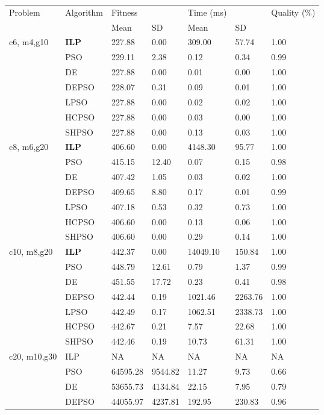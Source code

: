 \begin{table}[]
\small
\begin{tabular}{lllllll}
Problem & Algorithm & Fitness &  & Time (ms) &  & Quality (\%) \\
 &  & Mean & SD & Mean & SD &  \\
c6, m4,g10 & \textbf{ILP} & 227.88 & 0.00 & 309.00 & 57.74 & 1.00 \\
 & PSO & 229.11 & 2.38 & 0.12 & 0.34 & 0.99 \\
 & DE & 227.88 & 0.00 & 0.01 & 0.00 & 1.00 \\
 & DEPSO & 228.07 & 0.31 & 0.09 & 0.01 & 1.00 \\
 & LPSO & 227.88 & 0.00 & 0.02 & 0.02 & 1.00 \\
 & HCPSO & 227.88 & 0.00 & 0.03 & 0.00 & 1.00 \\
 & SHPSO & 227.88 & 0.00 & 0.13 & 0.03 & 1.00 \\
c8, m6,g20 & \textbf{ILP} & 406.60 & 0.00 & 4148.30 & 95.77 & 1.00 \\
 & PSO & 415.15 & 12.40 & 0.07 & 0.15 & 0.98 \\
 & DE & 407.42 & 1.05 & 0.03 & 0.02 & 1.00 \\
 & DEPSO & 409.65 & 8.80 & 0.17 & 0.01 & 0.99 \\
 & LPSO & 407.18 & 0.53 & 0.32 & 0.73 & 1.00 \\
 & HCPSO & 406.60 & 0.00 & 0.13 & 0.06 & 1.00 \\
 & SHPSO & 406.60 & 0.00 & 0.29 & 0.14 & 1.00 \\
c10, m8,g20 & \textbf{ILP} & 442.37 & 0.00 & 14049.10 & 150.84 & 1.00 \\
 & PSO & 448.79 & 12.61 & 0.79 & 1.37 & 0.99 \\
 & DE & 451.55 & 17.72 & 0.23 & 0.41 & 0.98 \\
 & DEPSO & 442.44 & 0.19 & 1021.46 & 2263.76 & 1.00 \\
 & LPSO & 442.49 & 0.17 & 1062.51 & 2338.73 & 1.00 \\
 & HCPSO & 442.67 & 0.21 & 7.57 & 22.68 & 1.00 \\
 & SHPSO & 442.46 & 0.19 & 10.73 & 61.31 & 1.00 \\
c20, m10,g30 & ILP & NA & NA & NA & NA & NA \\
 & PSO & 64595.28 & 9544.82 & 11.27 & 9.73 & 0.66 \\
 & DE & 53655.73 & 4134.84 & 22.15 & 7.95 & 0.79 \\
 & DEPSO & 44055.97 & 4237.81 & 192.95 & 230.83 & 0.96 \\

\end{tabular}
\end{table}
